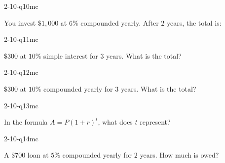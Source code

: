 \begin{practiceQuestion}{2-10-q10}{mc}
\begin{questionText}
You invest $\$1{,}000$ at $6\%$ compounded yearly. After $2$ years, the total is:
\end{questionText}
\end{practiceQuestion}

\begin{practiceQuestion}{2-10-q11}{mc}
\begin{questionText}
$\$300$ at $10\%$ simple interest for $3$ years. What is the total?
\end{questionText}
\end{practiceQuestion}

\begin{practiceQuestion}{2-10-q12}{mc}
\begin{questionText}
$\$300$ at $10\%$ compounded yearly for $3$ years. What is the total?
\end{questionText}
\end{practiceQuestion}

\begin{practiceQuestion}{2-10-q13}{mc}
\begin{questionText}
In the formula $A = P(1 + r)^t$, what does $t$ represent?
\end{questionText}
\end{practiceQuestion}

\begin{practiceQuestion}{2-10-q14}{mc}
\begin{questionText}
A $\$700$ loan at $5\%$ compounded yearly for $2$ years. How much is owed?
\end{questionText}
\end{practiceQuestion}

